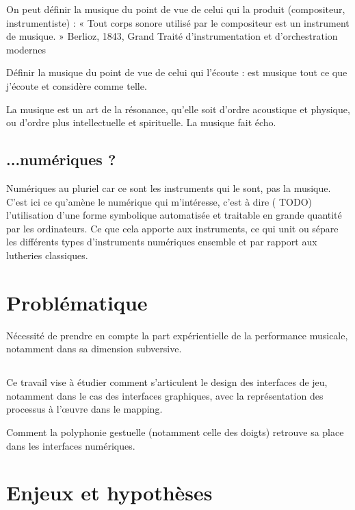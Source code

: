 On peut définir la musique du point de vue de celui qui la produit (compositeur, instrumentiste) : « Tout corps sonore utilisé par le compositeur est un instrument de musique. » Berlioz, 1843, Grand Traité d'instrumentation et d'orchestration modernes

Définir la musique du point de vue de celui qui l'écoute : est musique tout ce que j'écoute et considère comme telle.

La musique est un art de la résonance, qu'elle soit d'ordre acoustique et physique, ou d'ordre plus intellectuelle et spirituelle. La musique fait écho.

\subsection*{...numériques ?} 
Numériques au pluriel car ce sont les instruments qui le sont, pas la musique.
C'est ici ce qu'amène le numérique qui m'intéresse, c'est à dire ( TODO) l'utilisation d'une forme symbolique automatisée et traitable en grande quantité par les ordinateurs. Ce que cela apporte aux instruments, ce qui unit ou sépare les différents types d'instruments numériques ensemble et par rapport aux lutheries classiques.


\section{Problématique}


Nécessité de prendre en compte la part expérientielle de la performance musicale, notamment dans sa dimension subversive.


\subsection{} 
Ce travail vise à étudier comment s'articulent le design des interfaces de jeu, notamment dans le cas des interfaces graphiques, avec la représentation des processus à l'œuvre dans le mapping.


Comment la polyphonie gestuelle (notamment celle des doigts) retrouve sa place dans les interfaces numériques.


\section{Enjeux et hypothèses}

